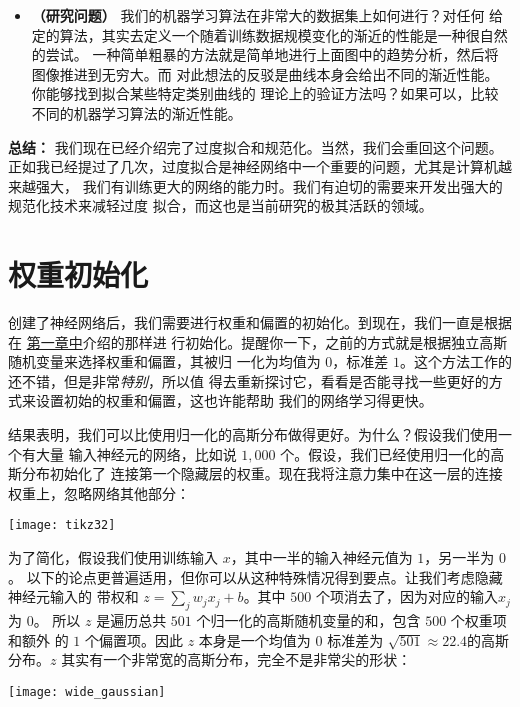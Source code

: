 \begin{itemize}
\item \textbf{（研究问题）} 我们的机器学习算法在非常大的数据集上如何进行？对任何
  给定的算法，其实去定义一个随着训练数据规模变化的渐近的性能是一种很自然的尝试。
  一种简单粗暴的方法就是简单地进行上面图中的趋势分析，然后将图像推进到无穷大。而
  对此想法的反驳是曲线本身会给出不同的渐近性能。你能够找到拟合某些特定类别曲线的
  理论上的验证方法吗？如果可以，比较不同的机器学习算法的渐近性能。
\end{itemize}

\textbf{总结：} 我们现在已经介绍完了过度拟合和规范化。当然，我们会重回这个问题。
正如我已经提过了几次，过度拟合是神经网络中一个重要的问题，尤其是计算机越来越强大，
我们有训练更大的网络的能力时。我们有迫切的需要来开发出强大的规范化技术来减轻过度
拟合，而这也是当前研究的极其活跃的领域。

\section{权重初始化}
\label{sec:weight_initialization}

创建了神经网络后，我们需要进行权重和偏置的初始化。到现在，我们一直是根据在%
\hyperref[ch:UsingNeuralNetsToRecognizeHandwrittenDigits]{第一章中}介绍的那样进
行初始化。提醒你一下，之前的方式就是根据独立高斯随机变量来选择权重和偏置，其被归
一化为均值为 $0$，标准差 $1$。这个方法工作的还不错，但是非常\emph{特别}，所以值
得去重新探讨它，看看是否能寻找一些更好的方式来设置初始的权重和偏置，这也许能帮助
我们的网络学习得更快。

结果表明，我们可以比使用归一化的高斯分布做得更好。为什么？假设我们使用一个有大量
输入神经元的网络，比如说 $1,000$ 个。假设，我们已经使用归一化的高斯分布初始化了
连接第一个隐藏层的权重。现在我将注意力集中在这一层的连接权重上，忽略网络其他部分：
\begin{center}
  \texttt{[image: tikz32]}
\end{center}

为了简化，假设我们使用训练输入 $x$，其中一半的输入神经元值为 $1$，另一半为 $0$。
以下的论点更普遍适用，但你可以从这种特殊情况得到要点。让我们考虑隐藏神经元输入的
带权和 $z=\sum_j w_j x_j + b$。其中 $500$ 个项消去了，因为对应的输入$x_j$ 为 $0$。
所以 $z$ 是遍历总共 $501$ 个归一化的高斯随机变量的和，包含 $500$ 个权重项和额外
的 $1$ 个偏置项。因此 $z$ 本身是一个均值为 $0$ 标准差为 $\sqrt{501} \approx
22.4$的高斯分布。$z$ 其实有一个非常宽的高斯分布，完全不是非常尖的形状：
\begin{center}
  \texttt{[image: wide\_gaussian]}
\end{center}

